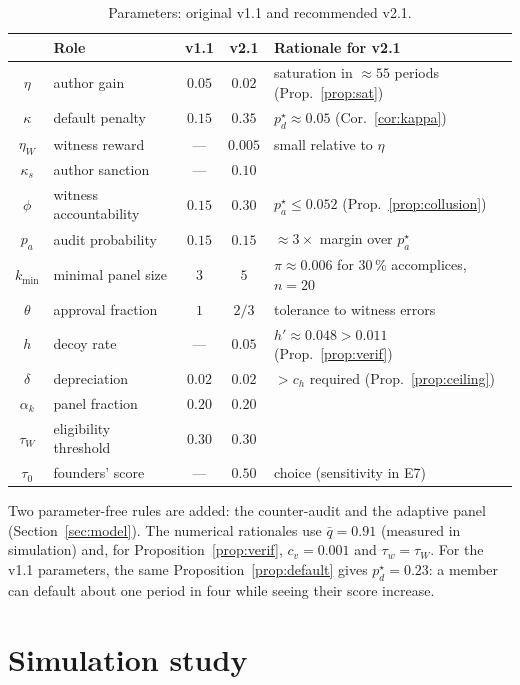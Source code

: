 \documentclass[11pt,a4paper]{article}
\theoremstyle{plain}
\theoremstyle{definition}
\theoremstyle{remark}
\newcommand{\1}{\mathbf{1}}
\begin{document}
\begin{table}[h]
\centering
\caption{Parameters: original v1.1 and recommended v2.1.}
\label{tab:params}
\small
\begin{tabular}{clccl}
\toprule
& Role & v1.1 & v2.1 & Rationale for v2.1 \\
\midrule
$\eta$ & author gain & $0.05$ & $0.02$ & saturation in $\approx55$ periods (Prop.~\ref{prop:sat}) \\
$\kappa$ & default penalty & $0.15$ & $0.35$ & $p^\star_d\approx0.05$ (Cor.~\ref{cor:kappa}) \\
$\eta_W$ & witness reward & --- & $0.005$ & small relative to $\eta$ \\
$\kappa_s$ & author sanction & --- & $0.10$ & \\
$\phi$ & witness accountability & $0.15$ & $0.30$ & $p^\star_a\le0.052$ (Prop.~\ref{prop:collusion}) \\
$p_a$ & audit probability & $0.15$ & $0.15$ & $\approx3\times$ margin over $p^\star_a$ \\
$k_{\min}$ & minimal panel size & $3$ & $5$ & $\pi\approx0.006$ for 30\,\% accomplices, $n=20$ \\
$\theta$ & approval fraction & $1$ & $2/3$ & tolerance to witness errors \\
$h$ & decoy rate & --- & $0.05$ & $h'\approx0.048>0.011$ (Prop.~\ref{prop:verif}) \\
$\delta$ & depreciation & $0.02$ & $0.02$ & $>c_h$ required (Prop.~\ref{prop:ceiling}) \\
$\alpha_k$ & panel fraction & $0.20$ & $0.20$ & \\
$\tau_W$ & eligibility threshold & $0.30$ & $0.30$ & \\
$\tau_0$ & founders' score & --- & $0.50$ & choice (sensitivity in E7) \\
\bottomrule
\end{tabular}
\end{table}

Two parameter-free rules are added: the counter-audit and the adaptive panel
(Section~\ref{sec:model}). The numerical rationales use $\bar q=0.91$ (measured
in simulation) and, for Proposition~\ref{prop:verif}, $c_v=0.001$ and
$\tau_w=\tau_W$. For the v1.1 parameters, the same
Proposition~\ref{prop:default} gives $p^\star_d=0.23$: a member can default
about one period in four while seeing their score increase.

\section{Simulation study}
\label{sec:simulation}
\end{document}
